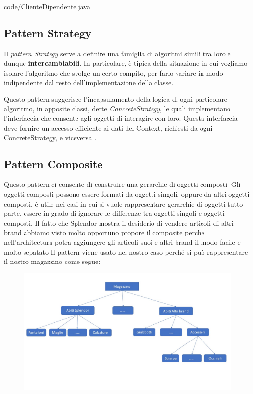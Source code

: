 \documentclass[12pt]{article}
\begin{document}

{code/ClienteDipendente.java}


\subsection{Pattern Strategy}

Il {\em pattern Strategy} serve a definire una famiglia di algoritmi simili tra loro e dunque \textbf{intercambiabili}. In particolare, è tipica della situazione in cui vogliamo isolare l’algoritmo che svolge un certo compito, per farlo variare in modo indipendente dal resto dell’implementazione della classe.

Questo pattern suggerisce l’incapsulamento della logica di ogni
particolare algoritmo, in apposite classi, dette {\em ConcreteStrategy}, le quali implementano l’interfaccia che consente agli oggetti di interagire con loro. Questa interfaccia deve fornire un accesso efficiente ai dati del Context, richiesti da ogni ConcreteStrategy, e viceversa \cite{gof_sunt}.


\subsection{Pattern Composite}
Questo pattern ci consente di construire una gerarchie di oggetti composti. Gli oggetti composti possono essere formati da oggetti singoli, oppure da altri oggetti composti. è utile nei casi in cui si vuole rappresentare gerarchie di oggetti tutto-parte, essere in grado di ignorare le differenze tra oggetti singoli e oggetti composti. Il fatto che Splendor mostra il desiderio di vendere articoli di altri brand abbiamo visto molto opportuno propore il composite perche nell'architectura potra aggiungere gli articoli suoi e altri brand il modo facile e molto sepatato
Il pattern viene usato nel nostro caso perché si può rappresentare il nostro magazzino come segue:

\begin{figure}
    \centering
    \includegraphics[width=1\linewidth]{images/Composite.jpg}
\end{figure}
\end{document}
